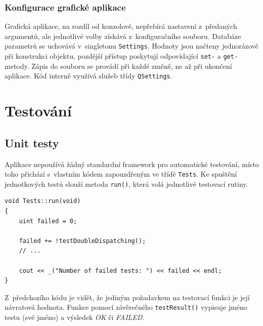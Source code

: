 \documentclass[11pt,twoside,a4paper]{book}
\begin{document}
\subsection{Konfigurace grafické aplikace}

Grafická aplikace, na rozdíl od konzolové, nepřebírá nastavení z~předaných argumentů, ale jednotlivé volby získává z~konfiguračního souboru. Databáze parametrů se uchovává v~singletonu \texttt{Settings}. Hodnoty jsou načteny jednorázově při konstrukci objektu, pozdější přístup poskytují odpovídající \texttt{set-} a \texttt{get-} metody. Zápis do souboru se provádí při každé změně, ne až při ukončení aplikace. Kód interně využívá služeb třídy \texttt{QSettings}.




\chapter{Testování}


\section{Unit testy}
\label{unit_testy}

Aplikace nepoužívá žádný standardní framework pro automatické testování, místo toho při\-chá\-zí s~vlastním kódem zapouzdřeným ve třídě \texttt{Tests}. Ke spuštění jednotkových testů slouží metoda \texttt{run()}, která volá jednotlivé testovací rutiny.

\begin{verbatim}
void Tests::run(void)
{
    uint failed = 0;

    failed += !testDoubleDispatching();
    // ...

    cout << _("Number of failed tests: ") << failed << endl;
}
\end{verbatim}

Z~předchozího kódu je vidět, že jediným požadavkem na testovací funkci je její návratová hodnota. Funkce pomocí závěrečného \texttt{testResult()} vypisuje jméno testu (své jméno) a výsledek \textit{OK} či \textit{FAILED}.
\end{document}
